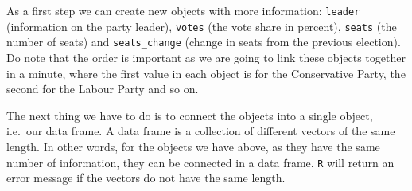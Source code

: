 \documentclass[12pt,oneside]{reedthesis}
\theoremstyle{definition}
\theoremstyle{definition}
\theoremstyle{definition}
\theoremstyle{remark}
\begin{document}
  As a first step we can create new objects with more information:
  \texttt{leader} (information on the party leader), \texttt{votes} (the
  vote share in percent), \texttt{seats} (the number of seats) and
  \texttt{seats\_change} (change in seats from the previous election). Do
  note that the order is important as we are going to link these objects
  together in a minute, where the first value in each object is for the
  Conservative Party, the second for the Labour Party and so on.
  \begin{Shaded}
  \begin{Highlighting}[]
  \StringTok{ }\NormalTok{(}\NormalTok{, }\NormalTok{, }\NormalTok{, }
              \NormalTok{, }\NormalTok{, }\NormalTok{)}
  \StringTok{ }\NormalTok{(}\NormalTok{, }\NormalTok{, }\NormalTok{, }\NormalTok{, }\NormalTok{, }\NormalTok{)}
  \StringTok{ }\NormalTok{(}\NormalTok{, }\NormalTok{, }\NormalTok{, }\NormalTok{, }\NormalTok{, }\NormalTok{)}
  \StringTok{ }\NormalTok{(}\OperatorTok{-}\NormalTok{, }\NormalTok{, }\OperatorTok{-}\NormalTok{, }\NormalTok{, }\NormalTok{, }\NormalTok{)}
  \end{Highlighting}
  \end{Shaded}
  The next thing we have to do is to connect the objects into a single
  object, i.e.~our data frame. A data frame is a collection of different
  vectors of the same length. In other words, for the objects we have
  above, as they have the same number of information, they can be
  connected in a data frame. \texttt{R} will return an error message if
  the vectors do not have the same length.
  
\end{document}
